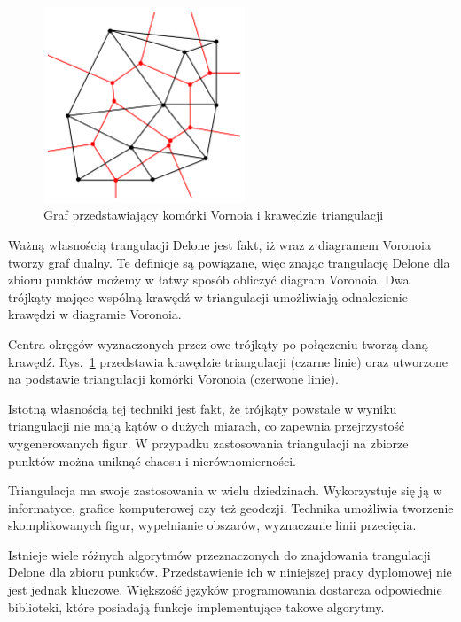 \begin{figure}[h]
	\centering
	\includegraphics[width=6cm]{zdjęcia/voronoi.png}
	\caption{Graf przedstawiający komórki Vornoia i krawędzie triangulacji \cite{tDelone2}} 
	\label{fig:voronoi}
\end{figure}

Ważną własnością trangulacji Delone jest fakt, iż wraz z diagramem Voronoia tworzy graf dualny. Te definicje są powiązane, więc znając trangulację Delone dla zbioru punktów możemy w łatwy sposób obliczyć diagram Voronoia. Dwa trójkąty mające wspólną krawędź w triangulacji umożliwiają odnalezienie krawędzi w diagramie Voronoia.

Centra okręgów wyznaczonych przez owe trójkąty po połączeniu tworzą daną krawędź. Rys.~\ref{fig:voronoi}  przedstawia krawędzie triangulacji (czarne linie) oraz utworzone na podstawie triangulacji komórki Voronoia (czerwone linie).

Istotną własnością tej techniki jest fakt, że trójkąty powstałe w wyniku triangulacji nie mają kątów o dużych miarach, co zapewnia przejrzystość wygenerowanych figur. W przypadku zastosowania triangulacji na zbiorze punktów można uniknąć chaosu i nierównomierności.

Triangulacja ma swoje zastosowania w wielu dziedzinach. Wykorzystuje się ją w informatyce, grafice komputerowej czy też geodezji. Technika umożliwia tworzenie skomplikowanych figur, wypełnianie obszarów, wyznaczanie linii przecięcia.

Istnieje wiele różnych algorytmów przeznaczonych do znajdowania trangulacji Delone dla zbioru punktów. Przedstawienie ich w niniejszej pracy dyplomowej nie jest jednak kluczowe. Większość języków programowania dostarcza odpowiednie biblioteki, które posiadają funkcje implementujące takowe algorytmy. 


